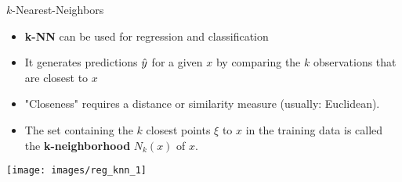 \documentclass[11pt,compress,t,notes=noshow, xcolor=table]{beamer}
\newenvironment{knitrout}{}{} %
\begin{document}
\begin{vbframe}{$k$-Nearest-Neighbors}

\begin{itemize}
\item \textbf{k-NN} can be used for regression and classification
\item It generates predictions $\hat{y}$ for a given $x$ by comparing the $k$ observations that are closest to $x$
\item "Closeness" requires a distance or similarity measure (usually: Euclidean).
\item The set containing the $k$ closest points $\xi$ to $x$ in the training data is called  the \textbf{k-neighborhood} $N_k(x)$ of $x$.
\end{itemize}


\begin{knitrout}\scriptsize
{}\color{fgcolor}

{\centering \texttt{[image: images/reg\_knn\_1]} 

}



\end{knitrout}

\end{vbframe}
\end{document}

